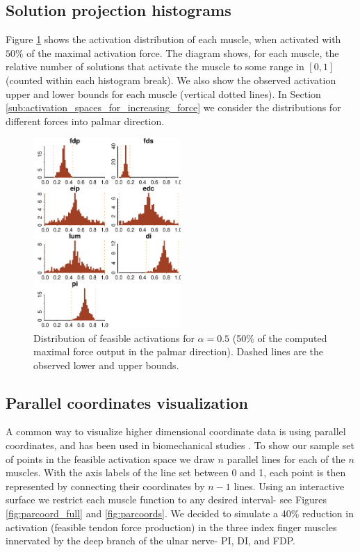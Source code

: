 \subsection{Solution projection histograms}
Figure \ref{fig:raw_histograms} shows the activation distribution of each muscle, when activated with $50\%$ of the maximal activation force. The diagram shows, for each muscle, the relative number of solutions that activate the muscle to some range in $[0,1]$ (counted within each histogram break).
We also show the observed activation upper and lower bounds for each muscle (vertical dotted lines).
In Section \ref{sub:activation_spaces_for_increasing_force} we consider the distributions for different forces into palmar direction.
\begin{figure}[!htbp]
\centering
\includegraphics[width=0.5\textwidth]{figs/raw_histograms.pdf}
\caption{Distribution of feasible activations for $\alpha= 0.5$ (50\% of the computed maximal force output in the palmar direction). Dashed lines are the observed lower and upper bounds.}
\label{fig:raw_histograms}
\end{figure}

\subsection{Parallel coordinates visualization}
A common way to visualize higher dimensional coordinate data is using parallel coordinates, and has been used in biomechanical studies \cite{bachynskyi2013biomechanical, krekel2010visual}.
To show our sample set of points in the feasible activation space we draw $n$ parallel lines for each of the $n$ muscles.
With the axis labels of the line set between 0 and 1, each point is then represented by connecting their coordinates by $n-1$ lines.
Using an interactive surface we restrict each muscle function to any desired interval- see Figures \ref{fig:parcoord_full} and \ref{fig:parcoords}.
We decided to simulate a 40\% reduction in activation (feasible tendon force production) in the three index finger muscles innervated by the deep branch of the ulnar nerve- PI, DI, and FDP. 

